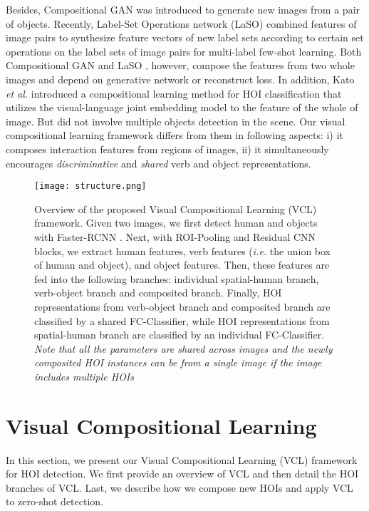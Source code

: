 \documentclass[runningheads]{llncs}
\newcommand{\etal}{\textit{et al.}}
\newcommand{\ie}{\textit{i.e. }}
\begin{document}
Besides, Compositional GAN \cite{azadi2018compositional} was introduced to generate new images from a pair of objects.
Recently, Label-Set Operations network (LaSO) \cite{alfassy2019laso} combined features of image pairs to synthesize feature vectors of new label sets according to certain set operations on the label sets of image pairs for multi-label few-shot learning.
Both Compositional GAN \cite{azadi2018compositional} and LaSO \cite{alfassy2019laso}, however, compose the features from two whole images
and depend on generative network or reconstruct loss.
In addition, Kato \etal \cite{kato2018compositional} introduced a compositional learning method for HOI classification \cite{chao2015hico} that utilizes the visual-language joint embedding model to the feature of the whole of image. But \cite{kato2018compositional} did not involve multiple objects detection in the scene.
Our visual compositional learning framework differs from them in following aspects: i) it composes interaction features from regions of images, ii) it simultaneously encourages \textit{discriminative} and \textit{shared} verb and object representations.


\begin{figure*}
\begin{center}
\texttt{[image: structure.png]}

\end{center}
   \caption{Overview of the proposed Visual Compositional Learning (VCL) framework. Given two images, we first detect human and objects with Faster-RCNN \cite{ren2015faster}. Next, with ROI-Pooling and Residual CNN blocks, we extract human features, verb features (\ie the union box of human and object), and object features. Then, these features are fed into the following branches: individual spatial-human branch, verb-object branch and composited branch. Finally, HOI representations from verb-object branch and composited branch are classified by a shared FC-Classifier, while HOI representations from spatial-human branch are classified by an individual FC-Classifier. \textit{Note that all the parameters are shared across images and the newly composited HOI instances can be from a single image if the image includes multiple HOIs}}
\label{fig:structure}
\end{figure*}

\section{Visual Compositional Learning}
In this section, we present our Visual Compositional Learning (VCL) framework for HOI detection. We first provide an overview of VCL and then detail the HOI branches of VCL. Last, we describe how we compose new HOIs and apply VCL to zero-shot detection.
\end{document}
